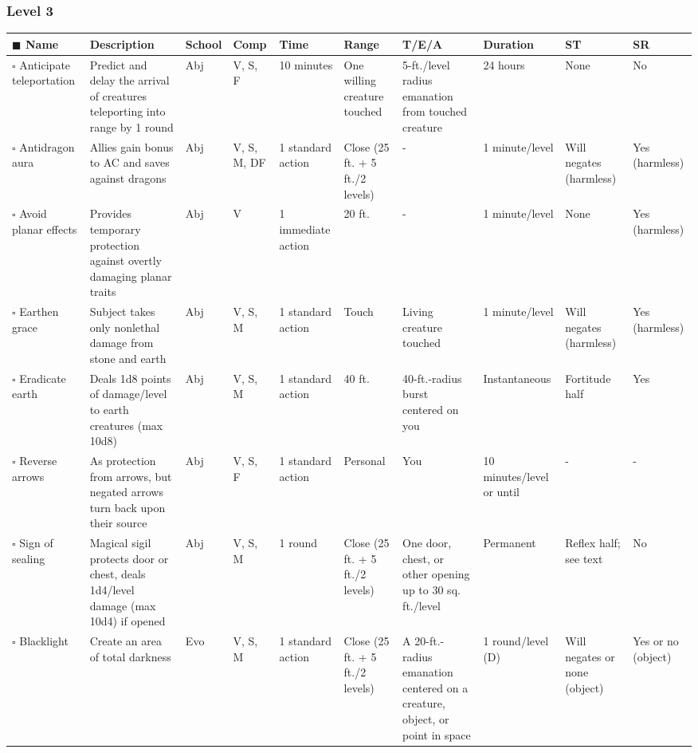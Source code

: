 \documentclass[12pt, a4paper]{article}
\begin{document}
\begin{center}
  \subsubsection*{Level 3}
  \begin{longtable}[H]{ p{8em} p{15em} p{2em} p{5em} p{6em} p{6em} p{10em} p{6em} p{5em} p{2em} }
    \(\blacksquare\) \textbf{Name} & \textbf{Description} & \textbf{School} & \textbf{Comp} & \textbf{Time} & \textbf{Range} & \textbf{T/E/A} & \textbf{Duration} & \textbf{ST} & \textbf{SR}\\
    \endhead
    \(\square\) Anticipate teleportation & Predict and delay the arrival of creatures teleporting into range by 1 round & Abj & V, S, F & 10 minutes & One willing creature touched & 5-ft./level radius emanation from touched creature & 24 hours & None & No\\
    \(\square\) Antidragon aura & Allies gain bonus to AC and saves against dragons & Abj & V, S, M, DF & 1 standard action & Close (25 ft. + 5 ft./2 levels) & - & 1 minute/level & Will negates (harmless) & Yes (harmless)\\
    \(\square\) Avoid planar effects & Provides temporary protection against overtly damaging planar traits & Abj & V & 1 immediate action & 20 ft. & - & 1 minute/level & None & Yes (harmless)\\
    \(\square\) Earthen grace & Subject takes only nonlethal damage from stone and earth & Abj & V, S, M & 1 standard action & Touch & Living creature touched & 1 minute/level & Will negates (harmless) & Yes (harmless)\\
    \(\square\) Eradicate earth & Deals 1d8 points of damage/level to earth creatures (max 10d8) & Abj & V, S, M & 1 standard action & 40 ft. & 40-ft.-radius burst centered on you & Instantaneous & Fortitude half & Yes\\
    \(\square\) Reverse arrows & As protection from arrows, but negated arrows turn back upon their source & Abj & V, S, F & 1 standard action & Personal & You & 10 minutes/level or until  & - & -\\
    \(\square\) Sign of sealing & Magical sigil protects door or chest, deals 1d4/level damage (max 10d4) if opened & Abj & V, S, M & 1 round & Close (25 ft. + 5 ft./2 levels) & One door, chest, or other opening up to 30 sq. ft./level & Permanent & Reﬂex half; see text & No\\
    \(\square\) Blacklight & Create an area of total darkness & Evo & V, S, M & 1 standard action & Close (25 ft. + 5 ft./2 levels) & A 20-ft.-radius emanation centered on a creature, object, or point in space & 1 round/level (D) & Will negates or none (object) & Yes or no (object)\\

\end{longtable}
\end{center}
\end{document}
